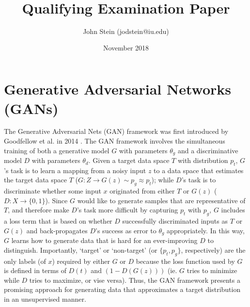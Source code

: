 \documentclass[11pt]{article}
\title{Qualifying Examination Paper}
\author{John Stein (jodstein@iu.edu)}
\date{November 2018}
\begin{document}
\begin{titlepage}
    \null
    \nointerlineskip
    \vfill
    \let\snewpage \newpage
    \let\newpage \relax
    \maketitle
    \let \newpage \snewpage
    \vfill
    \thispagestyle{empty}
\end{titlepage}


\tableofcontents
\thispagestyle{empty}


\newpage
\setcounter{page}{1}
\section{Generative Adversarial Networks (GANs)}

The Generative Adversarial Nets (GAN) framework was first introduced by Goodfellow et al. in 2014 \cite{NIPS2014_5423}.  The GAN framework involves the simultaneous training of both a generative model $G$ with parameters $\theta_g$ and a discriminative model $D$ with parameters $\theta_d$.  Given a target data space $T$ with distribution $p_t$, $G$'s task is to learn a mapping from a noisy input $z$ to a data space that estimates the target data space $T$ ($G:Z \rightarrow G(z) \sim p_g \approx p_t$); while $D$'s task is to discriminate whether some input $x$ originated from either $T$ or $G(z)$ ($D: X \rightarrow \{0, 1\}$).  Since $G$ would like to generate samples that are representative of $T$, and therefore make $D$'s task more difficult by capturing $p_t$ with $p_g$, $G$ includes a loss term that is based on whether $D$ successfully discriminated inputs as $T$ or $G(z)$ and back-propagates $D$'s success as error to $\theta_g$ appropriately.  In this way, $G$ learns how to generate data that is hard for an ever-improving $D$ to distinguish.  Importantly, `target' or `non-target' (or $\{p_t,p_{g}\}$, respectively) are the only labels (of $x$) required by either $G$ or $D$ because the loss function used by $G$ is defined in terms of $D(t)$ and $(1-D(G(z)))$ (ie. $G$ tries to minimize while $D$ tries to maximize, or vise versa).  Thus, the GAN framework presents a promising approach for generating data that approximates a target distribution in an unsupervised manner.
\end{document}
